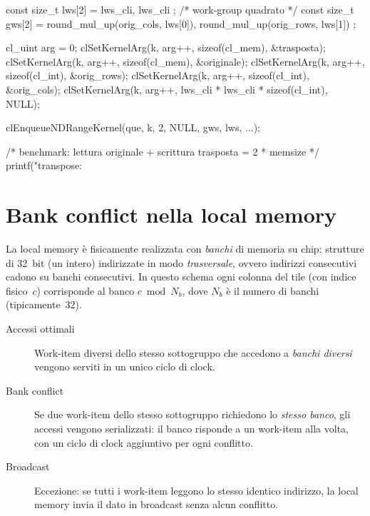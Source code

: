 \begin{code}[caption={Lancio del kernel di trasposizione con tile}, label={code:transpose_host}]
const size_t lws[2] = { lws_cli, lws_cli }; /* work-group quadrato */
const size_t gws[2] = { round_mul_up(orig_cols, lws[0]),
                         round_mul_up(orig_rows, lws[1]) };

cl_uint arg = 0;
clSetKernelArg(k, arg++, sizeof(cl_mem), &trasposta);
clSetKernelArg(k, arg++, sizeof(cl_mem), &originale);
clSetKernelArg(k, arg++, sizeof(cl_int), &orig_rows);
clSetKernelArg(k, arg++, sizeof(cl_int), &orig_cols);
clSetKernelArg(k, arg++, lws_cli * lws_cli * sizeof(cl_int), NULL);

clEnqueueNDRangeKernel(que, k, 2, NULL, gws, lws, ...);

/* benchmark: lettura originale + scrittura trasposta = 2 * memsize */
printf("transpose: %
\end{code}

\section{Bank conflict nella local memory}\label{sec:opencl_lmem_bank_conflict}

La local memory è fisicamente realizzata con \emph{banchi} di memoria su chip: strutture di 32~bit (un intero) indirizzate in modo \emph{trasversale}, ovvero indirizzi consecutivi cadono su banchi consecutivi. In questo schema ogni colonna del tile (con indice fisico~$c$) corrisponde al banco $c \bmod N_b$, dove $N_b$ è il numero di banchi (tipicamente~32).

\begin{description}
    \item[Accessi ottimali] Work-item diversi dello stesso sottogruppo che accedono a \emph{banchi diversi} vengono serviti in un unico ciclo di clock.

    \item[Bank conflict] Se due work-item dello stesso sottogruppo richiedono lo \emph{stesso banco}, gli accessi vengono serializzati: il banco risponde a un work-item alla volta, con un ciclo di clock aggiuntivo per ogni conflitto.

    \item[Broadcast] Eccezione: se tutti i work-item leggono lo stesso identico indirizzo, la local memory invia il dato in broadcast senza alcun conflitto.
\end{description}

